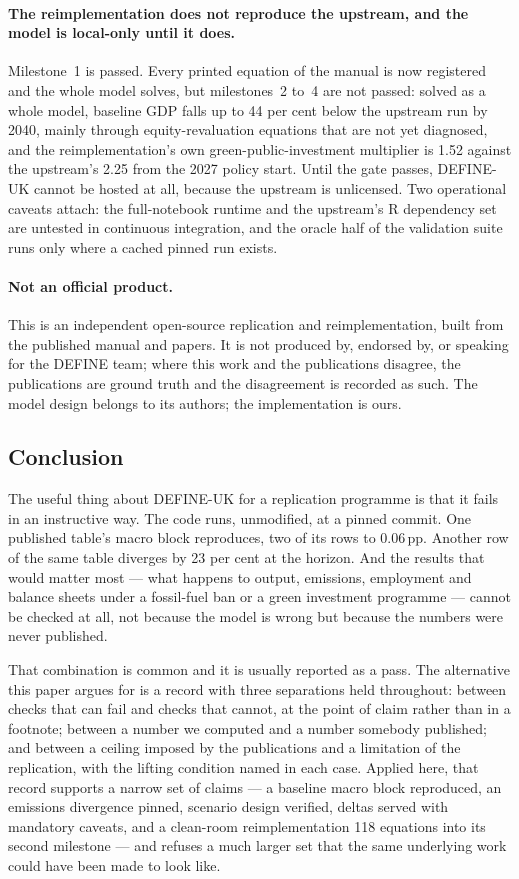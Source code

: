 \paragraph{The reimplementation does not reproduce the upstream, and the model is local-only until it does.} Milestone~1 is passed. Every printed equation of the manual is now registered and the whole model solves, but milestones~2 to~4 are not passed: solved as a whole model, baseline GDP falls up to 44 per cent below the upstream run by 2040, mainly through equity-revaluation equations that are not yet diagnosed, and the reimplementation's own green-public-investment multiplier is 1.52 against the upstream's 2.25 from the 2027 policy start. Until the gate passes, DEFINE-UK cannot be hosted at all, because the upstream is unlicensed. Two operational caveats attach: the full-notebook runtime and the upstream's R dependency set are untested in continuous integration, and the oracle half of the validation suite runs only where a cached pinned run exists.

\paragraph{Not an official product.} This is an independent open-source replication and reimplementation, built from the published manual and papers. It is not produced by, endorsed by, or speaking for the DEFINE team; where this work and the publications disagree, the publications are ground truth and the disagreement is recorded as such. The model design belongs to its authors; the implementation is ours.

\subsection*{Conclusion}

The useful thing about DEFINE-UK for a replication programme is that it fails in an instructive way. The code runs, unmodified, at a pinned commit. One published table's macro block reproduces, two of its rows to 0.06\,pp. Another row of the same table diverges by 23 per cent at the horizon. And the results that would matter most --- what happens to output, emissions, employment and balance sheets under a fossil-fuel ban or a green investment programme --- cannot be checked at all, not because the model is wrong but because the numbers were never published.

That combination is common and it is usually reported as a pass. The alternative this paper argues for is a record with three separations held throughout: between checks that can fail and checks that cannot, at the point of claim rather than in a footnote; between a number we computed and a number somebody published; and between a ceiling imposed by the publications and a limitation of the replication, with the lifting condition named in each case. Applied here, that record supports a narrow set of claims --- a baseline macro block reproduced, an emissions divergence pinned, scenario design verified, deltas served with mandatory caveats, and a clean-room reimplementation 118 equations into its second milestone --- and refuses a much larger set that the same underlying work could have been made to look like.

